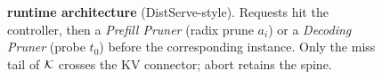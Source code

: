 \documentclass[11pt]{article}
\begin{document}
\begin{figure}[t]
\centering
\resizebox{\textwidth}{!}{}
\caption{\textbf{\sys{} runtime architecture} (DistServe-style).
Requests hit the controller, then a \emph{Prefill Pruner} (radix prune $a_i$)
or a \emph{Decoding Pruner} (probe $t_0$) before the corresponding instance.
Only the miss tail of $\mathcal{K}$ crosses the KV connector; abort retains the spine.}
\label{fig:core-arch}
\end{figure}
\end{document}
